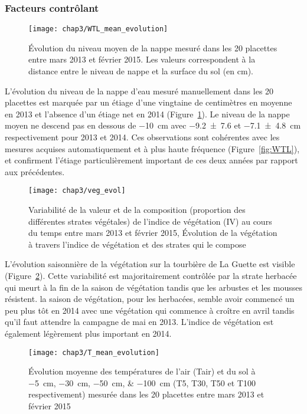 \subsubsection{Facteurs contrôlant}

\begin{figure}
\centering
\texttt{[image: chap3/WTL\_mean\_evolution]}
\caption{Évolution du niveau moyen de la nappe mesuré dans les 20 placettes entre mars 2013 et février 2015. Les valeurs correspondent à la distance entre le niveau de nappe et la surface du sol (en cm).}
\label{fig:WTL_mean_evolution}
\end{figure}

L'évolution du niveau de la nappe d'eau mesuré manuellement dans les 20 placettes est marquée par un étiage d'une vingtaine de centimètres en moyenne en 2013 et l'absence d'un étiage net en 2014 (Figure~\ref{fig:WTL_mean_evolution}).
Le niveau de la nappe moyen ne descend pas en dessous de \SI{-10}{\cm} avec \num{-9.2(76)} et \SI{-7.1(48)}{\centi\metre} respectivement pour 2013 et 2014.
Ces observations sont cohérentes avec les mesures acquises automatiquement et à plus haute fréquence (Figure~\ref{fig:WTL}), et confirment l'étiage particulièrement important de ces deux années par rapport aux précédentes.

\begin{figure}
\centering
\texttt{[image: chap3/veg\_evol]}
\caption{Variabilité de la valeur et de la composition (proportion des différentes strates végétales) de l'indice de végétation (IV) au cours du temps entre mars 2013 et février 2015, 
Évolution de la végétation à travers l'indice de végétation et des strates qui le compose}
\label{fig:veg_evol}
\end{figure}

L'évolution saisonnière de la végétation sur la tourbière de La Guette est visible (Figure~\ref{fig:veg_evol}).
Cette variabilité est majoritairement contrôlée par la strate herbacée qui meurt à la fin de la saison de végétation tandis que les arbustes et les mousses résistent.
la saison de végétation, pour les herbacées, semble avoir commencé un peu plus tôt en 2014 avec une végétation qui commence à croître en avril tandis qu'il faut attendre la campagne de mai en 2013.
L'indice de végétation est également légèrement plus important en 2014.

\begin{figure}
\centering
\texttt{[image: chap3/T\_mean\_evolution]}
\caption{Évolution moyenne des températures de l'air (Tair) et du sol à \SIlist{-5;-30;-50;-100}{\centi\metre} (T5, T30, T50 et T100 respectivement) mesurée dans les 20 placettes entre mars 2013 et février 2015}
\label{fig:T_mean_evolution}
\end{figure}

